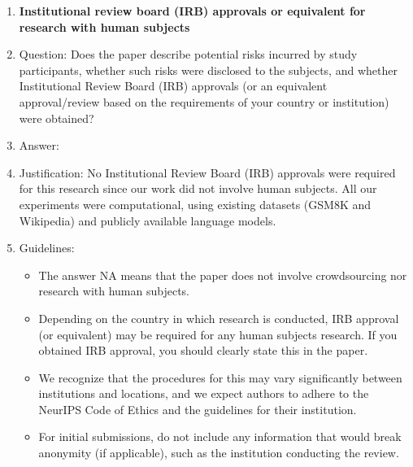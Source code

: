 \documentclass{article}
\begin{document}
\begin{enumerate}
\item {\bf Institutional review board (IRB) approvals or equivalent for research with human subjects}
    \item[] Question: Does the paper describe potential risks incurred by study participants, whether such risks were disclosed to the subjects, and whether Institutional Review Board (IRB) approvals (or an equivalent approval/review based on the requirements of your country or institution) were obtained?
    \item[] Answer: \answerNA{} %
    \item[] Justification: No Institutional Review Board (IRB) approvals were required for this research since our work did not involve human subjects. All our experiments were computational, using existing datasets (GSM8K and Wikipedia) and publicly available language models.
    \item[] Guidelines:
    \begin{itemize}
        \item The answer NA means that the paper does not involve crowdsourcing nor research with human subjects.
        \item Depending on the country in which research is conducted, IRB approval (or equivalent) may be required for any human subjects research. If you obtained IRB approval, you should clearly state this in the paper. 
        \item We recognize that the procedures for this may vary significantly between institutions and locations, and we expect authors to adhere to the NeurIPS Code of Ethics and the guidelines for their institution. 
        \item For initial submissions, do not include any information that would break anonymity (if applicable), such as the institution conducting the review.
    \end{itemize}


\end{enumerate}
\end{document}
